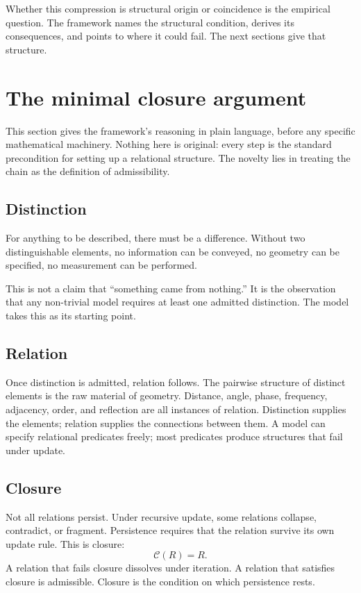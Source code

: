 \documentclass[11pt]{article}
\theoremstyle{plain}
\theoremstyle{definition}
\theoremstyle{remark}
\newcommand{\Ccal}{\mathcal{C}}
\begin{document}
Whether this compression is structural origin or coincidence is the empirical question. The framework names the structural condition, derives its consequences, and points to where it could fail. The next sections give that structure.

\section{The minimal closure argument}\label{sec:minimal}

This section gives the framework's reasoning in plain language, before any specific mathematical machinery. Nothing here is original: every step is the standard precondition for setting up a relational structure. The novelty lies in treating the chain as the definition of admissibility.

\subsection{Distinction}

For anything to be described, there must be a difference. Without two distinguishable elements, no information can be conveyed, no geometry can be specified, no measurement can be performed.

This is not a claim that ``something came from nothing.'' It is the observation that any non-trivial model requires at least one admitted distinction. The model takes this as its starting point.

\subsection{Relation}

Once distinction is admitted, relation follows. The pairwise structure of distinct elements is the raw material of geometry. Distance, angle, phase, frequency, adjacency, order, and reflection are all instances of relation. Distinction supplies the elements; relation supplies the connections between them. A model can specify relational predicates freely; most predicates produce structures that fail under update.

\subsection{Closure}

Not all relations persist. Under recursive update, some relations collapse, contradict, or fragment. Persistence requires that the relation survive its own update rule. This is closure:
\[
  \Ccal(R) = R.
\]
A relation that fails closure dissolves under iteration. A relation that satisfies closure is admissible. Closure is the condition on which persistence rests.
\end{document}
